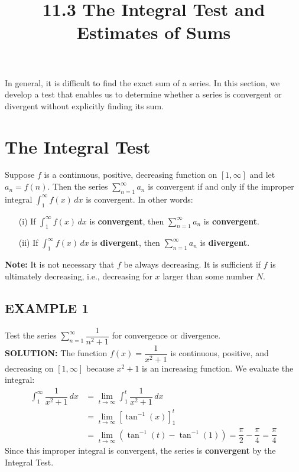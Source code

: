 \documentclass{article}
\title{11.3 The Integral Test and Estimates of Sums}
\date{}
\author{}
\theoremstyle{mystyle}
\begin{document}
\maketitle

In general, it is difficult to find the exact sum of a series. In this section, we develop a test that enables us to determine whether a series is convergent or divergent without explicitly finding its sum.

\section*{The Integral Test}

\begin{tcolorbox}[
    colback=white,
    colframe=orange!80!white,
    title=The Integral Test,
    boxrule=0.5mm,
    arc=3mm
    ]
    Suppose \(f\) is a continuous, positive, decreasing function on \([1, \infty]\) and let \(a_n = f(n)\). Then the series \( \sum_{n=1}^{\infty} a_n \) is convergent if and only if the improper integral \( \int_1^\infty f(x) \,dx \) is convergent. In other words:
    \begin{itemize}
        \item[(i)] If \( \int_1^\infty f(x) \,dx \) is \textbf{convergent}, then \( \sum_{n=1}^{\infty} a_n \) is \textbf{convergent}.
        \item[(ii)] If \( \int_1^\infty f(x) \,dx \) is \textbf{divergent}, then \( \sum_{n=1}^{\infty} a_n \) is \textbf{divergent}.
    \end{itemize}
    \textbf{Note:} It is not necessary that \(f\) be always decreasing. It is sufficient if \(f\) is ultimately decreasing, i.e., decreasing for \(x\) larger than some number \(N\).
\end{tcolorbox}

\subsection*{EXAMPLE 1}
Test the series \( \sum_{n=1}^{\infty} \dfrac{1}{n^2+1} \) for convergence or divergence.\\
\textbf{SOLUTION:}
The function \(f(x) = \dfrac{1}{x^2+1}\) is continuous, positive, and decreasing on \([1, \infty]\) because \(x^2+1\) is an increasing function. We evaluate the integral:
\begin{align*}
    \int_1^\infty \dfrac{1}{x^2+1} \,dx &= \lim_{t\to\infty} \int_1^t \dfrac{1}{x^2+1} \,dx \\
    &= \lim_{t\to\infty} \left[ \tan^{-1}(x) \right]_1^t \\
    &= \lim_{t\to\infty} (\tan^{-1}(t) - \tan^{-1}(1)) = \dfrac{\pi}{2} - \dfrac{\pi}{4} = \dfrac{\pi}{4}
\end{align*}
Since this improper integral is convergent, the series is \textbf{convergent} by the Integral Test.
\end{document}
